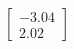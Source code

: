 \documentclass[preview]{standalone}
\begin{document}
\begin{align*}
\begin{bmatrix} -3.04 \\ 2.02 \end{bmatrix}
\end{align*}
\end{document}
